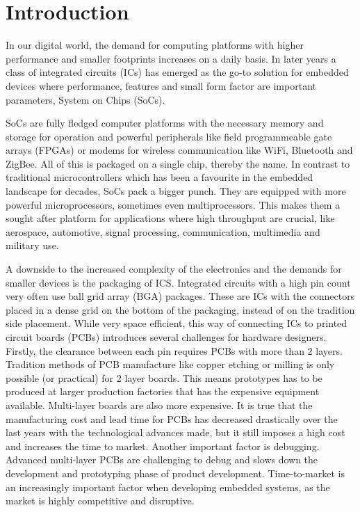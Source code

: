 \section{Introduction}

In our digital world, the demand for computing platforms with higher performance and smaller footprints increases on a daily basis. In later years a class of integrated circuits (ICs) has emerged as the go-to solution for embedded devices where performance, features and small form factor are important parameters, System on Chips (SoCs).

SoCs are fully fledged computer platforms with the necessary memory and storage for operation and powerful peripherals like field programmeable gate arrays (FPGAs) or modems for wireless communication like WiFi, Bluetooth and ZigBee. All of this is packaged on a single chip, thereby the name. In contrast to traditional microcontrollers which has been a favourite in the embedded landscape for decades, SoCs pack a bigger punch. They are equipped with more powerful microprocessors, sometimes even multiprocessors. This makes them a sought after platform for applications where high throughput are crucial, like aerospace, automotive, signal processing, communication, multimedia and military use.

A downside to the increased complexity of the electronics and the demands for smaller devices is the packaging of ICS. Integrated circuits with a high pin count very often use ball grid array (BGA) packages. These are ICs with the connectors placed in a dense grid on the bottom of the packaging, instead of on the tradition side placement. While very space efficient, this way of connecting ICs to printed circuit boards (PCBs) introduces several challenges for hardware designers. Firstly, the clearance between each pin requires PCBs with more than 2 layers. Tradition methods of PCB manufacture like copper etching or milling is only possible (or practical) for 2 layer boards. This means prototypes has to be produced at larger production factories that has the expensive equipment available. Multi-layer boards are also more expensive. It is true that the manufacturing cost and lead time for PCBs has decreased drastically over the last years with the technological advances made, but it still imposes a high cost and increases the time to market. Another important factor is debugging. Advanced multi-layer PCBs are challenging to debug and slows down the development and prototyping phase of product development. Time-to-market is an increasingly important factor when developing embedded systems, as the market is highly competitive and disruptive. 

